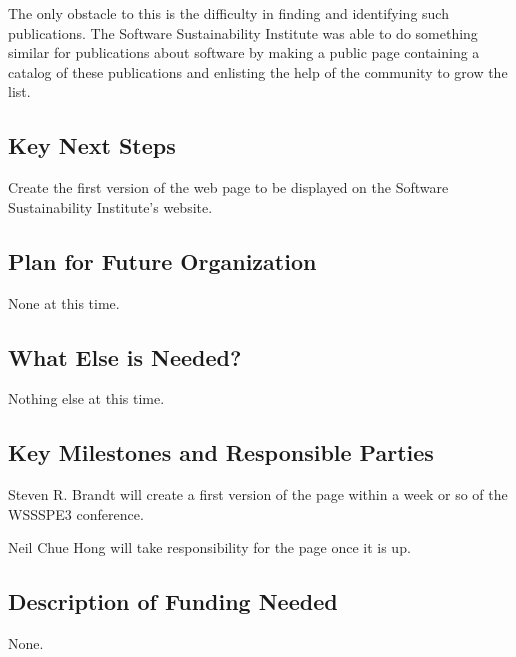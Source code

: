 The only obstacle to this is the difficulty in finding and identifying such
publications. The Software Sustainability Institute was able to do something similar
for publications about software by making a public page containing a catalog
of these publications and enlisting the help of the community to grow the list.

\subsection{Key Next Steps}

Create the first version of the web page to be displayed on the Software Sustainability
Institute's website.

\subsection{Plan for Future Organization}

None at this time.

\subsection{What Else is Needed?}

Nothing else at this time.

\subsection{Key Milestones and Responsible Parties}

Steven R. Brandt will create a first version of the page within a week or so of the WSSSPE3 conference.

Neil Chue Hong will take responsibility for the page once it is up.

\subsection{Description of Funding Needed}

None.
